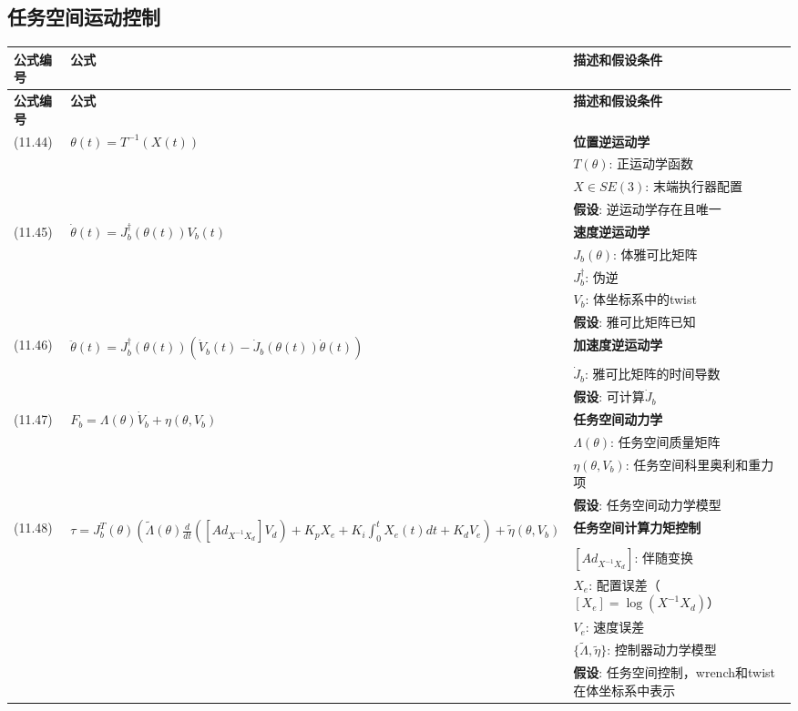 \documentclass[12pt,a4paper]{article}
\begin{document}
\subsection{任务空间运动控制}

\begin{longtable}{|p{}|p{}|p{}|}
\hline
\textbf{公式编号} & \textbf{公式} & \textbf{描述和假设条件} \\
\hline
\endfirsthead
\hline
\textbf{公式编号} & \textbf{公式} & \textbf{描述和假设条件} \\
\hline
\endhead
\hline
\endfoot
\hline
\endlastfoot

(11.44) & $\theta(t) = T^{-1}(X(t))$ & 
\textbf{位置逆运动学} \\
& & $T(\theta)$: 正运动学函数 \\
& & $X \in SE(3)$: 末端执行器配置 \\
& & \textbf{假设}: 逆运动学存在且唯一 \\
\hline

(11.45) & $\dot{\theta}(t) = J_b^{\dagger}(\theta(t))V_b(t)$ & 
\textbf{速度逆运动学} \\
& & $J_b(\theta)$: 体雅可比矩阵 \\
& & $J_b^{\dagger}$: 伪逆 \\
& & $V_b$: 体坐标系中的twist \\
& & \textbf{假设}: 雅可比矩阵已知 \\
\hline

(11.46) & $\ddot{\theta}(t) = J_b^{\dagger}(\theta(t))\left(\dot{V}_b(t) - \dot{J}_b(\theta(t))\dot{\theta}(t)\right)$ & 
\textbf{加速度逆运动学} \\
& & $\dot{J}_b$: 雅可比矩阵的时间导数 \\
& & \textbf{假设}: 可计算$\dot{J}_b$ \\
\hline

(11.47) & $F_b = \Lambda(\theta)\dot{V}_b + \eta(\theta, V_b)$ & 
\textbf{任务空间动力学} \\
& & $\Lambda(\theta)$: 任务空间质量矩阵 \\
& & $\eta(\theta, V_b)$: 任务空间科里奥利和重力项 \\
& & \textbf{假设}: 任务空间动力学模型 \\
\hline

(11.48) & $\tau = J_b^T(\theta)\left(\tilde{\Lambda}(\theta)\frac{d}{dt}([Ad_{X^{-1}X_d}]V_d) + K_p X_e + K_i\int_0^t X_e(t)dt + K_d V_e\right) + \tilde{\eta}(\theta, V_b)$ & 
\textbf{任务空间计算力矩控制} \\
& & $[Ad_{X^{-1}X_d}]$: 伴随变换 \\
& & $X_e$: 配置误差（$[X_e] = \log(X^{-1}X_d)$） \\
& & $V_e$: 速度误差 \\
& & $\{\tilde{\Lambda}, \tilde{\eta}\}$: 控制器动力学模型 \\
& & \textbf{假设}: 任务空间控制，wrench和twist在体坐标系中表示 \\
\hline


\end{longtable}
\end{document}
